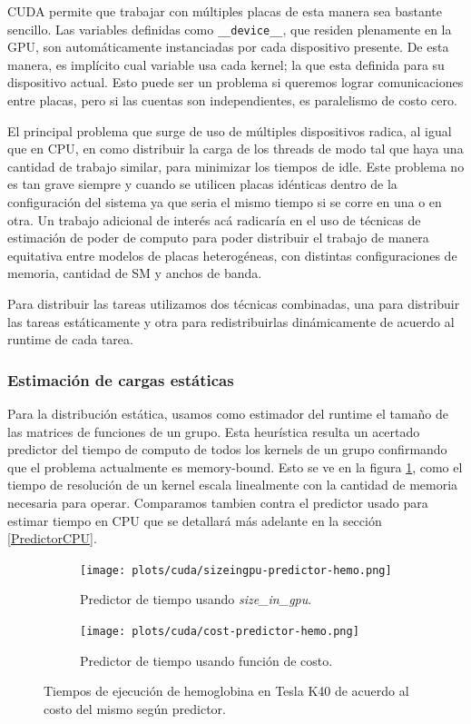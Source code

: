 CUDA permite que trabajar con m\'ultiples placas de esta manera sea bastante sencillo. Las variables
definidas como \texttt{\_\_device\_\_}, que residen plenamente en la GPU, son autom\'aticamente instanciadas
por cada dispositivo presente. De esta manera, es impl\'icito cual variable usa cada kernel; la que
esta definida para su dispositivo actual. Esto puede ser un problema si queremos lograr comunicaciones entre placas,
pero si las cuentas son independientes, es paralelismo de costo cero.

El principal problema que surge de uso de m\'ultiples dispositivos radica, al igual que en
CPU, en como distribuir la carga de los threads de modo tal que haya una cantidad de trabajo
similar, para minimizar los tiempos de idle. Este problema no es tan grave siempre y cuando
se utilicen placas id\'enticas dentro de la configuraci\'on del sistema ya que seria
el mismo tiempo si se corre en una o en otra. Un trabajo adicional de inter\'es ac\'a
radicar\'ia en el uso de t\'ecnicas de estimaci\'on de poder de computo para poder
distribuir el trabajo de manera equitativa entre modelos de placas heterog\'eneas, con distintas
configuraciones de memoria, cantidad de SM y anchos de banda.

Para distribuir las tareas utilizamos dos t\'ecnicas combinadas, una para distribuir las
tareas est\'aticamente y otra para redistribuirlas din\'amicamente de acuerdo al runtime de
cada tarea.


\subsubsection{Estimaci\'on de cargas est\'aticas}
Para la distribuci\'on est\'atica, usamos como estimador del runtime el tama\~no
de las matrices de funciones de un grupo. Esta heur\'istica resulta un acertado predictor
del tiempo de computo de todos los
kernels de un grupo confirmando que el problema actualmente es memory-bound. Esto se ve en la figura
\ref{fig:runtime-predictor}, como el tiempo de resoluci\'on de un kernel escala linealmente con
la cantidad de memoria necesaria para operar. Comparamos tambien contra el predictor usado
para estimar tiempo en CPU que se detallar\'a m\'as adelante en la secci\'on \ref{PredictorCPU}.

\begin{figure}[htbp]
   \centering
   \begin{subfigure}[b]{\plotwidthtres}
    \texttt{[image: plots/cuda/sizeingpu-predictor-hemo.png]}
     \caption{Predictor de tiempo usando \textit{size\_in\_gpu}.}
   \end{subfigure}
   \begin{subfigure}[b]{\plotwidthtres}
    \texttt{[image: plots/cuda/cost-predictor-hemo.png]}
     \caption{Predictor de tiempo usando funci\'on de costo.}
   \end{subfigure}
   \caption{Tiempos de ejecuci\'on de hemoglobina en Tesla K40 de acuerdo al costo del mismo seg\'un predictor.}
   \label{fig:runtime-predictor}
\end{figure}

